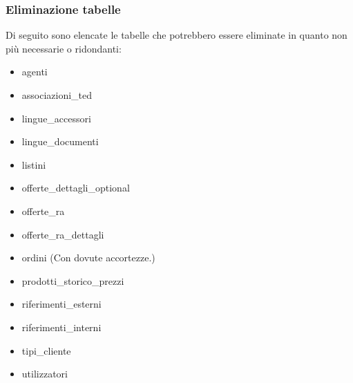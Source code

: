 \documentclass[12pt, a4paper]{article}
\begin{document}
\subsubsection{Eliminazione tabelle}
Di seguito sono elencate le tabelle che potrebbero essere eliminate in quanto non più necessarie o ridondanti:
\begin{itemize}
    \item agenti
    \item associazioni\_ted
    \item lingue\_accessori
    \item lingue\_documenti
    \item listini
    \item offerte\_dettagli\_optional
    \item offerte\_ra
    \item offerte\_ra\_dettagli
    \item ordini (Con dovute accortezze.)
    \item prodotti\_storico\_prezzi
    \item riferimenti\_esterni
    \item riferimenti\_interni
    \item tipi\_cliente
    \item utilizzatori
\end{itemize}
\end{document}
